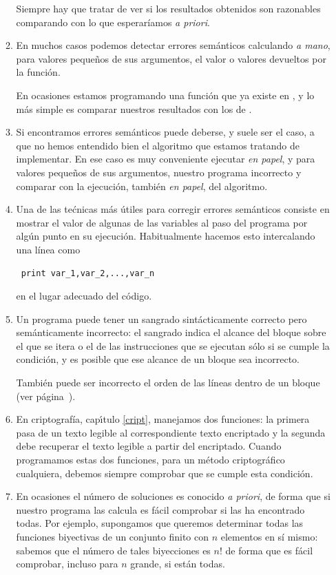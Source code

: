 \begin{enumerate}
\begin{enumerate}
Siempre hay que tratar de ver si los resultados obtenidos son razonables
comparando con lo que esperaríamos {\itshape a priori}.
 
 \item En muchos casos podemos detectar errores semánticos calculando 
{\itshape a mano}, para valores pequeños de sus argumentos, el valor o valores
devueltos por la función.

En ocasiones estamos programando una función que ya existe en {\sage},  y lo
más simple es comparar nuestros resultados con los de {\sage}.

\item Si encontramos errores semánticos puede deberse, y suele ser el caso,  a
que no hemos entendido bien el algoritmo que estamos tratando de implementar. En
ese caso es muy conveniente ejecutar {\itshape en papel},  y para valores
pequeños de sus argumentos, nuestro programa incorrecto y comparar con la
ejecución, también {\itshape en papel}, del algoritmo. 

\item Una de las te\'cnicas más útiles para corregir errores semánticos
consiste en mostrar el valor de algunas de las variables al paso del
programa por algún punto en su ejecución. Habitualmente hacemos esto
intercalando una línea como
\begin{lstlisting}
 print var_1,var_2,...,var_n
\end{lstlisting}
en el lugar adecuado del código.

\item Un programa puede tener un sangrado sintácticamente correcto pero
semánticamente incorrecto: el sangrado indica el alcance del bloque sobre el
que se itera o el de las instrucciones que se ejecutan sólo si se cumple la
condición, y es posible que ese alcance de un bloque sea incorrecto. 

También puede ser incorrecto el orden de las líneas dentro de un bloque (ver
página~\pageref{func-orbita}).



\item En criptografía, cap\'{\i}tulo \ref{cript},  
manejamos dos funciones: la primera
pasa de un texto legible al correspondiente texto encriptado y la segunda debe
recuperar el texto legible a partir del encriptado. Cuando programamos estas dos
funciones,  para un método criptográfico cualquiera, debemos siempre
comprobar que se cumple esta condición. 


\item En ocasiones el número de soluciones es conocido {\itshape a priori}, de
forma que si nuestro programa las calcula es fácil comprobar si las ha
encontrado todas. Por ejemplo, supongamos que queremos determinar todas las
funciones biyectivas de un conjunto finito con $n$ elementos en sí mismo:
sabemos que el número de tales biyecciones es $n!$ de forma que es fácil
comprobar, incluso para $n$ grande, si están todas.


\end{enumerate}
\end{enumerate}
